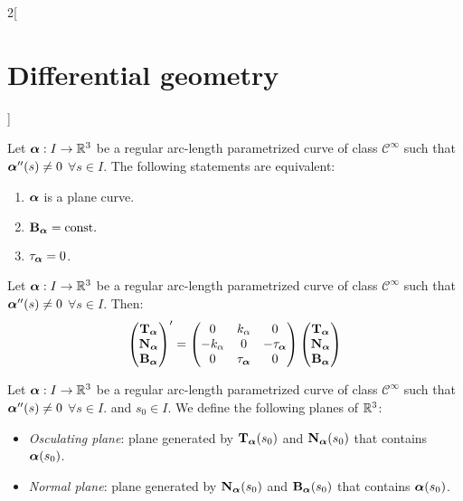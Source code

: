\documentclass[../../../main.tex]{subfiles}
\begin{document}
\begin{multicols}{2}[\section{Differential geometry}]
\begin{proposition}
  \end{proposition}
  \begin{proposition}
    Let $\boldsymbol{\mathrm{\alpha}}:I\rightarrow\mathbb{R}^3$ be a regular arc-length parametrized curve of class $\mathcal{C}^\infty$ such that $\boldsymbol{\mathrm{\alpha}}''(s)\ne 0$ $\forall s\in I$. The following statements are equivalent:
    \begin{enumerate}
      \item $\boldsymbol{\mathrm{\alpha}}$ is a plane curve.
      \item ${\boldsymbol{\mathrm{B}}_{\boldsymbol{\mathrm{\alpha}}}}=\text{const.}$
      \item ${\tau_{\boldsymbol{\mathrm{\alpha}}}}=0$.
    \end{enumerate}
  \end{proposition}
  \begin{theorem}
    Let $\boldsymbol{\mathrm{\alpha}}:I\rightarrow\mathbb{R}^3$ be a regular arc-length parametrized curve of class $\mathcal{C}^\infty$ such that $\boldsymbol{\mathrm{\alpha}}''(s)\ne 0$ $\forall s\in I$. Then:
    $$
      \begin{pmatrix}
        {\boldsymbol{\mathrm{T}}_{\boldsymbol{\mathrm{\alpha}}}} \\
        {\boldsymbol{\mathrm{N}}_{\boldsymbol{\mathrm{\alpha}}}} \\
        {\boldsymbol{\mathrm{B}}_{\boldsymbol{\mathrm{\alpha}}}} \\
      \end{pmatrix}'=
      \begin{pmatrix}
        0         & k_\alpha  & 0          \\
        -k_\alpha & 0         & -{\tau_{\boldsymbol{\mathrm{\alpha}}}} \\
        0         & {\tau_{\boldsymbol{\mathrm{\alpha}}}} & 0
      \end{pmatrix}
      \begin{pmatrix}
        {\boldsymbol{\mathrm{T}}_{\boldsymbol{\mathrm{\alpha}}}} \\
        {\boldsymbol{\mathrm{N}}_{\boldsymbol{\mathrm{\alpha}}}} \\
        {\boldsymbol{\mathrm{B}}_{\boldsymbol{\mathrm{\alpha}}}} \\
      \end{pmatrix}
    $$
  \end{theorem}
  \begin{definition}
    Let $\boldsymbol{\mathrm{\alpha}}:I\rightarrow\mathbb{R}^3$ be a regular arc-length parametrized curve of class $\mathcal{C}^\infty$ such that $\boldsymbol{\mathrm{\alpha}}''(s)\ne 0$ $\forall s\in I$. and $s_0\in I$. We define the following planes of $\mathbb{R}^3$:
    \begin{itemize}
      \item \emph{Osculating plane}: plane generated by ${\boldsymbol{\mathrm{T}}_{\boldsymbol{\mathrm{\alpha}}}}(s_0)$ and ${\boldsymbol{\mathrm{N}}_{\boldsymbol{\mathrm{\alpha}}}}(s_0)$ that contains $\boldsymbol{\mathrm{\alpha}}(s_0)$.
      \item \emph{Normal plane}: plane generated by ${\boldsymbol{\mathrm{N}}_{\boldsymbol{\mathrm{\alpha}}}}(s_0)$ and ${\boldsymbol{\mathrm{B}}_{\boldsymbol{\mathrm{\alpha}}}}(s_0)$ that contains $\boldsymbol{\mathrm{\alpha}}(s_0)$.

\end{itemize}
\end{definition}
\end{multicols}
\end{document}
